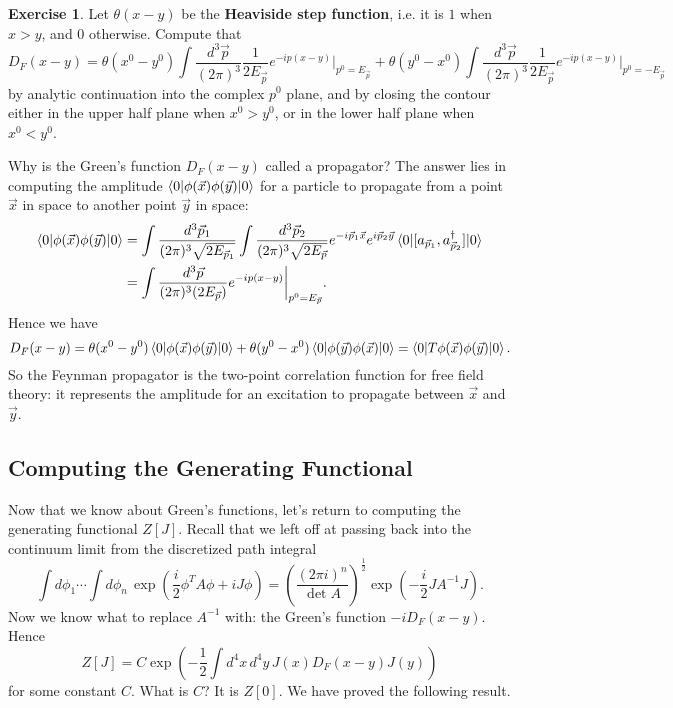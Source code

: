 \documentclass{report}
\theoremstyle{plain}
\theoremstyle{definition}
\newtheorem{exercise}{Exercise}[section]
\theoremstyle{remark}
\begin{document}
\begin{exercise}
  Let $\theta(x - y)$ be the {\bf Heaviside step function}, i.e. it is
  $1$ when $x > y$, and $0$ otherwise. Compute that
  $$ D_F(x - y) = \theta(x^0 - y^0) \int \frac{d^3\vec{p}}{(2\pi)^3} \frac{1}{2E_{\vec p}} e^{-ip(x-y)}\bigg|_{p^0 = E_{\vec p}} + \theta(y^0 - x^0) \int \frac{d^3\vec{p}}{(2\pi)^3} \frac{1}{2E_{\vec p}} e^{-ip(x-y)}\bigg|_{p^0 = -E_{\vec p}} $$
  by analytic continuation into the complex $p^0$ plane, and by
  closing the contour either in the upper half plane when $x^0 > y^0$,
  or in the lower half plane when $x^0 < y^0$.
\end{exercise}

Why is the Green's function $D_F(x - y)$ called a propagator? The
answer lies in computing the amplitude
$\braket{0|\phi(\vec x)\phi(\vec y)|0}$ for a particle to propagate
from a point $\vec{x}$ in space to another point $\vec{y}$ in space:
\begin{align*}
  \braket{0|\phi(\vec x)\phi(\vec y)|0} 
  &= \int \frac{d^3\vec{p}_1}{(2\pi)^3 \sqrt{2E_{\vec{p}_1}}} \int \frac{d^3\vec{p}_2}{(2\pi)^3 \sqrt{2E_{\vec{p}}}} e^{-i\vec{p}_1\vec{x}} e^{i\vec{p}_2\vec{y}} \braket{0|[a_{\vec{p}_1}, a^\dagger_{\vec{p}_2}]|0} \\
  &= \int \frac{d^3\vec{p}}{(2\pi)^3 (2E_{\vec p})} e^{-ip(x - y)}\bigg|_{p^0 = E_{\vec p}}.
\end{align*}
Hence we have
$$ D_F(x - y) = \theta(x^0 - y^0)\braket{0|\phi(\vec x)\phi(\vec y)|0} + \theta(y^0 - x^0)\braket{0|\phi(\vec y)\phi(\vec x)|0} = \braket{0|T\phi(\vec x)\phi(\vec y)|0}. $$
So the Feynman propagator is the two-point correlation function for
free field theory: it represents the amplitude for an excitation to
propagate between $\vec x$ and $\vec y$.

\subsection{Computing the Generating Functional}

Now that we know about Green's functions, let's return to computing
the generating functional $Z[J]$. Recall that we left off at passing
back into the continuum limit from the discretized path integral
$$ \int d\phi_1 \cdots \int d\phi_n \, \exp\left(\frac{i}{2} \phi^T A \phi + iJ\phi\right) = \left(\frac{(2\pi i)^n}{\det A}\right)^{\frac{1}{2}} \exp\left(-\frac{i}{2} JA^{-1}J\right). $$
Now we know what to replace $A^{-1}$ with: the Green's function
$-iD_F(x - y)$. Hence
$$ Z[J] = C \exp\left(-\frac{1}{2} \int d^4x \, d^4y \, J(x) D_F(x - y) J(y)\right) $$
for some constant $C$. What is $C$? It is $Z[0]$. We have proved the
following result.
\end{document}
